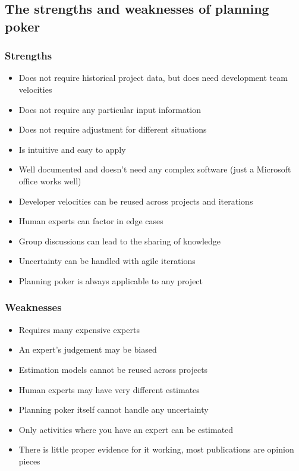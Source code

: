 \subsection{The strengths and weaknesses of planning poker}\label{sub:the_strengths_and_weaknesses_of_planning_poker}

\subsubsection{Strengths}\label{ssub:strengths}

\begin{itemize}
	\item Does not require historical project data, but does need development team velocities
	\item Does not require any particular input information
	\item Does not require adjustment for different situations
	\item Is intuitive and easy to apply
	\item Well documented and doesn't need any complex software (just a Microsoft office works well)
	\item Developer velocities can be reused across projects and iterations
	\item Human experts can factor in edge cases
	\item Group discussions can lead to the sharing of knowledge
	\item Uncertainty can be handled with agile iterations
	\item Planning poker is always applicable to any project
\end{itemize}

\subsubsection{Weaknesses}\label{ssub:weaknesses}

\begin{itemize}
	\item Requires many expensive experts
	\item An expert's judgement may be biased
	\item Estimation models cannot be reused across projects
	\item Human experts may have very different estimates
	\item Planning poker itself cannot handle any uncertainty
	\item Only activities where you have an expert can be estimated
	\item There is little proper evidence for it working, most publications are opinion pieces
\end{itemize}

